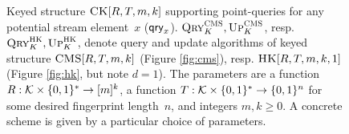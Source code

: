 \begin{figure}[h]
{	}
	\caption[The Count-Keeper Structure.]{Keyed structure $\textnormal{\textsc{CK}}[R,T,m,k]$ supporting point-queries for any potential stream element~$x$ ($\mathsf{qry}_x$).
		$\textnormal{\textsc{Qry}}^{\textnormal{\textsc{CMS}}}_{K}, \textnormal{\textsc{Up}}^{\textnormal{\textsc{CMS}}}_{K}$, resp. $\textnormal{\textsc{Qry}}^{\textnormal{\textsc{HK}}}_{K},  \textnormal{\textsc{Up}}^{\textnormal{\textsc{HK}}}_{K}$, denote query and update algorithms of keyed structure $\textnormal{\textsc{CMS}}[R,T,m,k]$ (Figure \ref{fig:cms}), resp. $\textnormal{\textsc{HK}}[R,T,m,k,1]$ (Figure \ref{fig:hk}, but note $d=1$). 
		The parameters are a function $R: \mathcal{K}\times\{0,1\}^* \to [m]^k$, a function $T: \mathcal{K}\times\{0,1\}^* \to \{0,1\}^n$ for some desired fingerprint length~$n$, and integers $m,k \geq 0$. A concrete scheme is given by a particular choice of parameters.}
	\label{fig:ck}
\end{figure}


